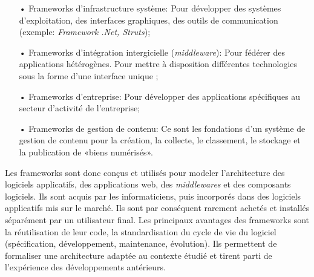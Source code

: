 \documentclass[ebook, 8pt, oneside, openany]{memoir}
\begin{document}
	\begin{itemize}
		\item[•] Frameworks d'infrastructure système: Pour développer des systèmes d'exploitation, des 
		interfaces graphiques, des outils de communication (exemple: \textit{Framework .Net, Struts});
		\item[•] Frameworks d'intégration intergicielle (\textit{middleware}): Pour fédérer des applications 
		hétérogènes. Pour mettre à disposition différentes technologies sous la forme d'une interface unique 
		;
		\item[•] Frameworks d'entreprise: Pour développer des applications spécifiques au secteur d'activité 
		de l'entreprise;
		\item[•] Frameworks de gestion de contenu: Ce sont les fondations d'un système de gestion de contenu 
		pour la création, la collecte, le classement, le stockage et la publication de «biens numérisés».\\
	\end{itemize}
	Les frameworks sont donc conçus et utilisés pour modeler l'architecture des logiciels applicatifs, des 
	applications web, des \textit{middlewares} et des composants logiciels. Ils sont acquis par 
	les informaticiens, puis incorporés dans des logiciels applicatifs mis sur le marché. Ils sont par 
	conséquent rarement achetés et installés séparément par un utilisateur final. Les principaux avantages 
	des frameworks sont la réutilisation de leur code, la standardisation du cycle de vie du logiciel 
	(spécification, développement, maintenance, évolution). Ils permettent de formaliser une architecture 
	adaptée au contexte étudié et tirent parti de l'expérience des développements antérieurs.
\end{document}
